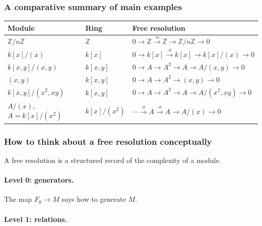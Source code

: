 \documentclass[12pt,a4paper]{article}
\theoremstyle{notespace}
\newcommand{\ZZ}{\mathbb{Z}}
\begin{document}
\subsubsection{A comparative summary of main examples}

\begin{center}
	\renewcommand{\arraystretch}{1.35}
	\begin{tabular}{>{\raggedright\arraybackslash}p{} >{\raggedright\arraybackslash}p{} >{\raggedright\arraybackslash}p{}}
		\toprule
		Module & Ring & Free resolution \\
		\midrule
		\(\ZZ/n\ZZ\) & \(\ZZ\) &
		\(
		0\to \ZZ \xrightarrow{\cdot n} \ZZ \to \ZZ/n\ZZ\to 0
		\) \\
		
		\(k[x]/(x)\) & \(k[x]\) &
		\(
		0\to k[x] \xrightarrow{\cdot x} k[x] \to k[x]/(x)\to 0
		\) \\
		
		\(k[x,y]/(x,y)\) & \(k[x,y]\) &
		\(
		0\to A \to A^2 \to A \to A/(x,y)\to 0
		\) \\
		
		\((x,y)\) & \(k[x,y]\) &
		\(
		0\to A \to A^2 \to (x,y)\to 0
		\) \\
		
		\(k[x,y]/(x^2,xy)\) & \(k[x,y]\) &
		\(
		0\to A \to A^2 \to A \to A/(x^2,xy)\to 0
		\) \\
		
		\(A/(x)\), \(A=k[x]/(x^2)\) & \(k[x]/(x^2)\) &
		\(
		\cdots \xrightarrow{\cdot x} A \xrightarrow{\cdot x} A \to A/(x)\to 0
		\) \\
		\bottomrule
	\end{tabular}
\end{center}

\subsubsection{How to think about a free resolution conceptually}

A free resolution is a structured record of the complexity of a module.

\paragraph{Level 0: generators.}

The map \(F_0\to M\) says how to generate \(M\).

\paragraph{Level 1: relations.}
\end{document}
